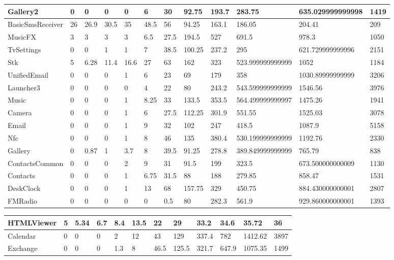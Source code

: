 \begin{tabular}{|l|l|l|l|l|l|l|l|l|l|l|l|}
\hline
Gallery2&0&0&0&0&6&30&92.75&193.7&283.75&635.029999999998&1419\\
\hline
BasicSmsReceiver&26&26.9&30.5&35&48.5&56&94.25&163.1&186.05&204.41&209\\
\hline
MusicFX&3&3&3&3&6.5&27.5&194.5&527&691.5&978.3&1050\\
\hline
TvSettings&0&0&1&1&7&38.5&100.25&237.2&295&621.729999999996&2151\\
\hline
Stk&5&6.28&11.4&16.6&27&63&162&323&523.999999999999&1052&1184\\
\hline
UnifiedEmail&0&0&0&1&6&23&69&179&358&1030.89999999999&3206\\
\hline
Launcher3&0&0&0&0&4&22&80&243.2&543.599999999999&1546.56&3976\\
\hline
Music&0&0&0&1&8.25&33&133.5&353.5&564.499999999997&1475.26&1941\\
\hline
Camera&0&0&0&1&6&27.5&112.25&301.9&551.55&1525.03&3078\\
\hline
Email&0&0&0&1&9&32&102&247&418.5&1087.9&5158\\
\hline
Nfc&0&0&0&1&8&46&135&380.4&530.199999999999&1192.76&2330\\
\hline
Gallery&0&0.87&1&3.7&8&39.5&91.25&278.8&389.849999999999&765.79&838\\
\hline
ContactsCommon&0&0&0&2&9&31&91.5&199&323.5&673.500000000009&1130\\
\hline
Contacts&0&0&0&1&6.75&31.5&88&188&279.85&858.47&1531\\
\hline
DeskClock&0&0&0&1&13&68&157.75&329&450.75&884.430000000001&2807\\
\hline
FMRadio&0&0&0&0&0&0.5&80&282.3&561.9&929.860000000001&1393\\
\hline
\end{tabular}
\newline
\begin{tabular}{|l|l|l|l|l|l|l|l|l|l|l|l|}
\hline
HTMLViewer&5&5.34&6.7&8.4&13.5&22&29&33.2&34.6&35.72&36\\
\hline
Calendar&0&0&0&2&12&43&129&337.4&782&1412.62&3897\\
\hline
Exchange&0&0&0&1.3&8&46.5&125.5&321.7&647.9&1075.35&1499\\
\hline
\end{tabular}
